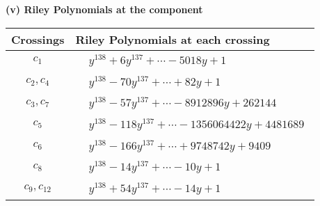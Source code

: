 \documentclass[1p]{elsarticle_modified}
\theoremstyle{definition}
\begin{document}
\newpage\renewcommand{\arraystretch}{1}
\flushleft \textbf{(v) Riley Polynomials at the component}\newline \\
\begin{tabular}{m{50pt}|m{274pt}}
Crossings & \hspace{64pt}Riley Polynomials at each crossing \\
\hline $$\begin{aligned}c_{1}\end{aligned}$$&$\begin{aligned}
&y^{138}+6 y^{137}+\cdots-5018 y+1
\end{aligned}$\\
\hline $$\begin{aligned}c_{2},c_{4}\end{aligned}$$&$\begin{aligned}
&y^{138}-70 y^{137}+\cdots+82 y+1
\end{aligned}$\\
\hline $$\begin{aligned}c_{3},c_{7}\end{aligned}$$&$\begin{aligned}
&y^{138}-57 y^{137}+\cdots-8912896 y+262144
\end{aligned}$\\
\hline $$\begin{aligned}c_{5}\end{aligned}$$&$\begin{aligned}
&y^{138}-118 y^{137}+\cdots-1356064422 y+4481689
\end{aligned}$\\
\hline $$\begin{aligned}c_{6}\end{aligned}$$&$\begin{aligned}
&y^{138}-166 y^{137}+\cdots+9748742 y+9409
\end{aligned}$\\
\hline $$\begin{aligned}c_{8}\end{aligned}$$&$\begin{aligned}
&y^{138}-14 y^{137}+\cdots-10 y+1
\end{aligned}$\\
\hline $$\begin{aligned}c_{9},c_{12}\end{aligned}$$&$\begin{aligned}
&y^{138}+54 y^{137}+\cdots-14 y+1
\end{aligned}$\\

\end{tabular}
\end{document}
